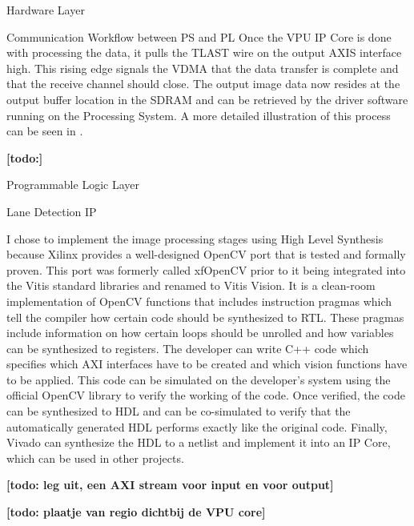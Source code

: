 \documentclass{matthijs}
\begin{document}
\begin{hoofdstuk}{Hardware Layer}
\begin{paragraaf}{Communication Workflow between PS and PL}
			Once the VPU IP Core is done with processing the data, it pulls the TLAST wire on the output AXIS interface high.
			This rising edge signals the VDMA that the data transfer is complete and that the receive channel should close.
			The output image data now resides at the output buffer location in the SDRAM and can be retrieved by the driver software running on the Processing System.
			A more detailed illustration of this process can be seen in .

		\end{paragraaf}

		\textbf{[todo:]}

	\end{hoofdstuk}

	\begin{hoofdstuk}{Programmable Logic Layer}

		\begin{paragraaf}{Lane Detection IP}

			I chose to implement the image processing stages using High Level Synthesis because Xilinx provides a well-designed OpenCV port that is tested and formally proven.
			This port was formerly called xfOpenCV prior to it being integrated into the Vitis standard libraries and renamed to Vitis Vision.
			It is a clean-room implementation of OpenCV functions that includes instruction pragmas which tell the compiler how certain code should be synthesized to RTL.
			These pragmas include information on how certain loops should be unrolled and how variables can be synthesized to registers.
			The developer can write C++ code which specifies which AXI interfaces have to be created and which vision functions have to be applied.
			This code can be simulated on the developer's system using the official OpenCV library to verify the working of the code.
			Once verified, the code can be synthesized to HDL and can be co-simulated to verify that the automatically generated HDL performs exactly like the original code.
			Finally, Vivado can synthesize the HDL to a netlist and implement it into an IP Core, which can be used in other projects.
			

			\bigskip

			\textbf{[todo: leg uit, een AXI stream voor input en voor output]}

			\bigskip

			\textbf{[todo: plaatje van regio dichtbij de VPU core]}


\end{paragraaf}
\end{hoofdstuk}
\end{document}
